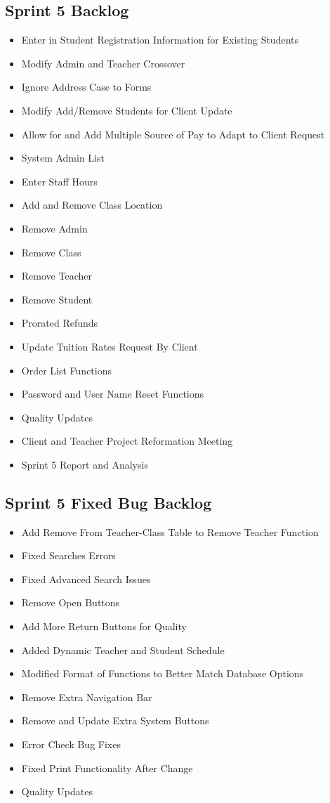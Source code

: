 \subsection{Sprint 5 Backlog}
\begin{itemize}
\item Enter in Student Registration Information for Existing Students
\item Modify Admin and Teacher Crossover 
\item Ignore Address Case to Forms 
\item Modify Add/Remove Students for Client Update
\item Allow for and Add Multiple Source of Pay to Adapt to Client Request 
\item System Admin List
\item Enter Staff Hours 
\item Add and Remove Class Location
\item Remove Admin
\item Remove Class
\item Remove Teacher
\item Remove Student
\item Prorated Refunds
\item Update Tuition Rates Request By Client
\item Order List Functions
\item Password and User Name Reset Functions
\item Quality Updates
\item Client and Teacher Project Reformation Meeting
\item Sprint 5 Report and Analysis 
\end{itemize}

\subsection{Sprint 5 Fixed Bug Backlog}
\begin{itemize}
\item Add Remove From Teacher-Class Table to Remove Teacher Function
\item Fixed Searches Errors
\item Fixed Advanced Search Issues 
\item Remove Open Buttons
\item Add More Return Buttons for Quality 
\item Added Dynamic Teacher and Student Schedule
\item Modified Format of Functions to Better Match Database Options 
\item Remove Extra Navigation Bar
\item Remove and Update Extra System Buttons
\item Error Check Bug Fixes
\item Fixed Print Functionality After Change
\item Quality Updates 
\end{itemize}



